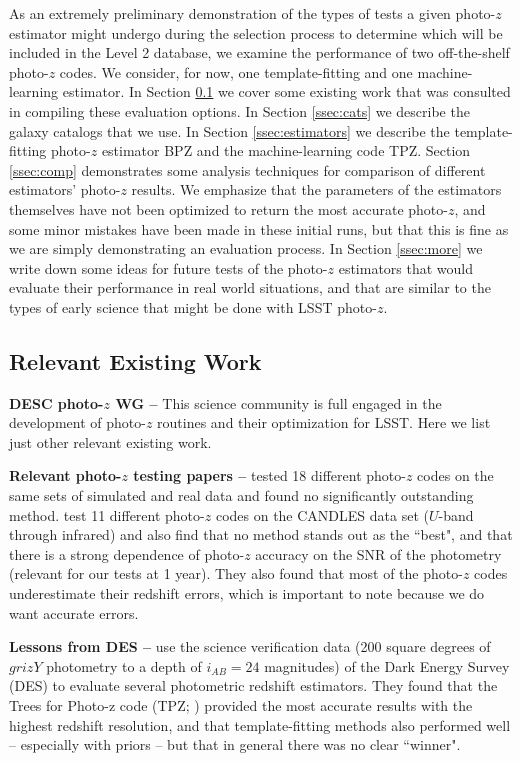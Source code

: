 \documentclass[DM,lsstdraft,toc]{lsstdoc}
\begin{document}
As an extremely preliminary demonstration of the types of tests a given photo-$z$ estimator might undergo during the selection process to determine which will be included in the Level 2 database, we examine the performance of two off-the-shelf photo-$z$ codes. We consider, for now, one template-fitting and one machine-learning estimator. In Section \ref{ssec:options_lit} we cover some existing work that was consulted in compiling these evaluation options. In Section \ref{ssec:cats} we describe the galaxy catalogs that we use. In Section \ref{ssec:estimators} we describe the template-fitting photo-$z$ estimator BPZ and the machine-learning code TPZ. Section \ref{ssec:comp} demonstrates some analysis techniques for comparison of different estimators' photo-$z$ results. We emphasize that the parameters of the estimators themselves have not been optimized to return the most accurate photo-$z$, and some minor mistakes have been made in these initial runs, but that this is fine as we are simply demonstrating an evaluation process. In Section \ref{ssec:more} we write down some ideas for future tests of the photo-$z$ estimators that would evaluate their performance in real world situations, and that are similar to the types of early science that might be done with LSST photo-$z$.


\subsection{Relevant Existing Work}\label{ssec:options_lit}

\textbf{DESC photo-$z$ WG --} This science community is full engaged in the development of photo-$z$ routines and their optimization for LSST. Here we list just other relevant existing work.

\textbf{Relevant photo-$z$ testing papers --} \cite{2010A&A...523A..31H} tested 18 different photo-$z$ codes on the same sets of simulated and real data and found no significantly outstanding method. \cite{2013ApJ...775...93D} test 11 different photo-$z$ codes on the CANDLES data set ($U$-band through infrared) and also find that no method stands out as the ``best", and that there is a strong dependence of photo-$z$ accuracy on the SNR of the photometry (relevant for our tests at 1 year). They also found that most of the photo-$z$ codes underestimate their redshift errors, which is important to note because we do want accurate errors.

\textbf{Lessons from DES --} \cite{2014MNRAS.445.1482S} use the science verification data (200 square degrees of $grizY$ photometry to a depth of $i_{AB}=24$ magnitudes) of the Dark Energy Survey (DES) to evaluate several photometric redshift estimators. They found that the Trees for Photo-z code (TPZ; \citealt{2013ascl.soft04011C}) provided the most accurate results with the highest redshift resolution, and that template-fitting methods also performed well -- especially with priors -- but that in general there was no clear ``winner".
\end{document}
